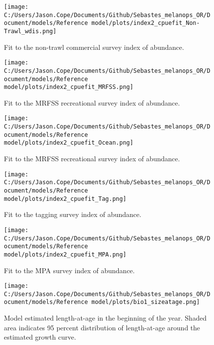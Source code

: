 \documentclass[11pt,
  english,
  letterpaper,
]{article}
\begin{document}
\begin{figure}
\centering
\texttt{[image: C:/Users/Jason.Cope/Documents/Github/Sebastes\_melanops\_OR/Document/models/Reference model/plots/index2\_cpuefit\_Non-Trawl\_wdis.png]}
\caption{Fit to the non-trawl commercial survey index of abundance.\label{fig:nontrawl-index-fit}}
\end{figure}

\begin{figure}
\centering
\texttt{[image: C:/Users/Jason.Cope/Documents/Github/Sebastes\_melanops\_OR/Document/models/Reference model/plots/index2\_cpuefit\_MRFSS.png]}
\caption{Fit to the MRFSS recreational survey index of abundance.\label{fig:mrfss-index-fit}}
\end{figure}

\begin{figure}
\centering
\texttt{[image: C:/Users/Jason.Cope/Documents/Github/Sebastes\_melanops\_OR/Document/models/Reference model/plots/index2\_cpuefit\_Ocean.png]}
\caption{Fit to the MRFSS recreational survey index of abundance.\label{fig:orbs-index-fit}}
\end{figure}

\begin{figure}
\centering
\texttt{[image: C:/Users/Jason.Cope/Documents/Github/Sebastes\_melanops\_OR/Document/models/Reference model/plots/index2\_cpuefit\_Tag.png]}
\caption{Fit to the tagging survey index of abundance.\label{fig:tag-index-fit}}
\end{figure}

\begin{figure}
\centering
\texttt{[image: C:/Users/Jason.Cope/Documents/Github/Sebastes\_melanops\_OR/Document/models/Reference model/plots/index2\_cpuefit\_MPA.png]}
\caption{Fit to the MPA survey index of abundance.\label{fig:mpa-index-fit}}
\end{figure}

\begin{figure}
\centering
\texttt{[image: C:/Users/Jason.Cope/Documents/Github/Sebastes\_melanops\_OR/Document/models/Reference model/plots/bio1\_sizeatage.png]}
\caption{Model estimated length-at-age in the beginning of the year. Shaded area indicates 95 percent distribution of length-at-age around the estimated growth curve.\label{fig:len-age-ss}}
\end{figure}
\end{document}
